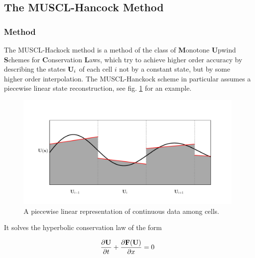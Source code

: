 \subsection{The MUSCL-Hancock Method} \label{chap:MUSCL-hancock}











\subsubsection{Method}

The MUSCL-Hackock method is a method of the class of \textbf{M}onotone \textbf{U}pwind \textbf{S}chemes for \textbf{C}onservation \textbf{L}aws, which try to achieve higher order accuracy by describing the states $\mathbf{U}_i$ of each cell $i$ not by a constant state, but by some higher order interpolation.
The MUSCL-Hanckock scheme in particular assumes a piecewise linear state reconstruction, see fig. \ref{fig:piecewise-linear} for an example.


\begin{figure}[H]
	\includegraphics[width=\textwidth]{./figures/piecewise_linear.pdf}%
	\caption{
		A piecewise linear representation of continuous data among cells.
		\label{fig:piecewise-linear}
		}
\end{figure}


It solves the hyperbolic conservation law of the form

\begin{equation*}
	\frac{\partial \mathbf{U}}{\partial t} + \frac{\partial \mathbf{F}(\mathbf{U})}{\partial x} = 0
\end{equation*}

